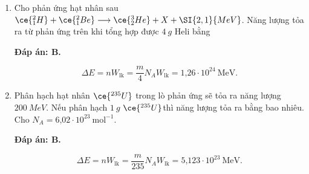 \begin{enumerate}[label=\bfseries Câu \arabic*:]
	\item {} 
	\cauhoi
	{Cho phản ứng hạt nhân sau $\ce{^2_1 H} + \ce{^2_1 Be} \longrightarrow \ce{^3_2 He} + X + \SI{2,1}{MeV}$. Năng lượng tỏa ra từ phản ứng trên khi tổng hợp được $\SI{4}{g}$ Heli bằng
		
	}
	
	\loigiai
	{		\textbf{Đáp án: B.}
		
	$$\Delta E = nW_\text{lk} = \dfrac{m}{4}N_A W_\text{lk} = \text{1,26}\cdot 10^{24}\ \text{MeV}.$$
	}
	
		\item {} 
	\cauhoi
	{Phân hạch hạt nhân $\ce{^{235} U}$ trong lò phản ứng sẽ tỏa ra năng lượng $\SI{200}{MeV}$. Nếu phân hạch $\SI{1}{g}$ $\ce{^{235} U}$thì năng lượng tỏa ra bằng bao nhiêu. Cho $N_A = \text{6,02}\cdot 10^{23}\ \text{mol}^{-1}$.
		
	}
	
	\loigiai
	{		\textbf{Đáp án: B.}
		
		$$\Delta E = nW_\text{lk} = \dfrac{m}{235}N_A W_\text{lk} = \text{5,123}\cdot 10^{23}\ \text{MeV}.$$
	}
	
	
\end{enumerate}

